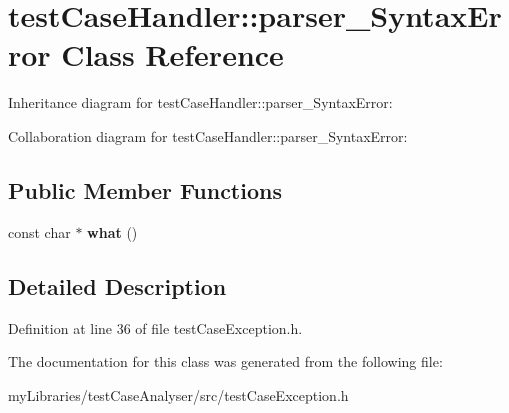 \hypertarget{classtestCaseHandler_1_1parser__SyntaxError}{}\section{test\+Case\+Handler\+::parser\+\_\+\+Syntax\+Error Class Reference}
\label{classtestCaseHandler_1_1parser__SyntaxError}


Inheritance diagram for test\+Case\+Handler\+::parser\+\_\+\+Syntax\+Error\+:


Collaboration diagram for test\+Case\+Handler\+::parser\+\_\+\+Syntax\+Error\+:
\subsection*{Public Member Functions}
\begin{DoxyCompactItemize}
\item 
\mbox{\label{classtestCaseHandler_1_1parser__SyntaxError_a5fcce8dde55a60d581f5ae4e88b492ab}} 
const char $\ast$ {\bfseries what} ()
\end{DoxyCompactItemize}


\subsection{Detailed Description}


Definition at line 36 of file test\+Case\+Exception.\+h.



The documentation for this class was generated from the following file\+:\begin{DoxyCompactItemize}
\item 
my\+Libraries/test\+Case\+Analyser/src/test\+Case\+Exception.\+h\end{DoxyCompactItemize}
